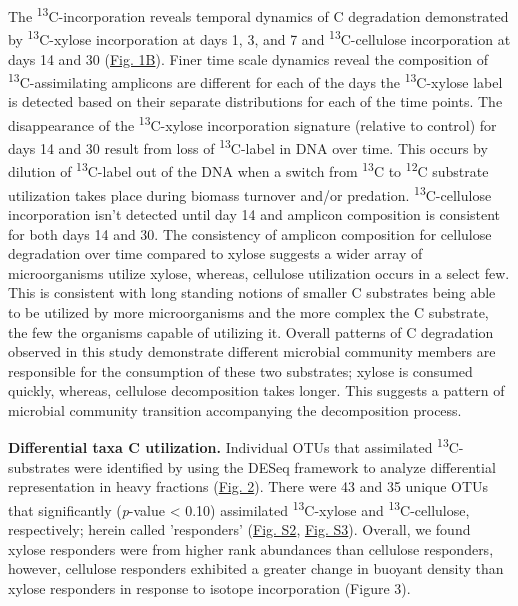 The \textsuperscript{13}C-incorporation reveals temporal dynamics of C degradation demonstrated by \textsuperscript{13}C-xylose incorporation at days 1, 3, and 7 and \textsuperscript{13}C-cellulose incorporation at days 14 and 30 (\href{https://www.authorea.com/users/3537/articles/3612/master/file/figures/ordination_all1/ordination_all1.png}{Fig. 1B}). Finer time scale dynamics reveal the composition of \textsuperscript{13}C-assimilating amplicons are different for each of the days the \textsuperscript{13}C-xylose label is detected based on their separate distributions for each of the time points. The disappearance of the \textsuperscript{13}C-xylose incorporation signature (relative to control) for days 14 and 30 result from loss of \textsuperscript{13}C-label in DNA over time. This occurs by dilution of \textsuperscript{13}C-label out of the DNA when a switch from \textsuperscript{13}C to \textsuperscript{12}C substrate utilization takes place during biomass turnover and/or predation. \textsuperscript{13}C-cellulose incorporation isn't detected until day 14 and amplicon composition is consistent for both days 14 and 30.  The consistency of amplicon composition for cellulose degradation over time compared to xylose suggests a wider array of microorganisms utilize xylose, whereas, cellulose utilization occurs in a select few.  This is consistent with long standing notions of smaller C substrates being able to be utilized by more microorganisms and the more complex the C substrate, the few the organisms capable of utilizing it. Overall patterns of C degradation observed in this study demonstrate different microbial community members are responsible for the consumption of these two substrates; xylose is consumed quickly, whereas, cellulose decomposition takes longer. This suggests a pattern of microbial community transition accompanying the decomposition process. 





\textbf{Differential taxa C utilization.} Individual OTUs that assimilated \textsuperscript{13}C-substrates were identified by using the DESeq framework \cite{Anders_Huber_2010} to analyze differential representation in heavy fractions (\href{https://www.authorea.com/users/3537/articles/3612/master/file/figures/l2fc_fig1/l2fc_fig.pdf}{Fig. 2}). There were 43 and 35 unique OTUs that significantly (\textit{p}-value < 0.10) assimilated \textsuperscript{13}C-xylose and \textsuperscript{13}C-cellulose, respectively; herein called 'responders' (\href{https://www.authorea.com/users/3537/articles/8459/master/file/figures/OTU_screening_schematic/OTU_screening_schematic.pdf}{Fig. S2}, \href{https://www.authorea.com/users/3537/articles/8459/master/file/figures/l2fc_fig_pVal/l2fc_fig_pVal.png}{Fig. S3}). Overall, we found xylose responders were from higher rank abundances than cellulose responders, however, cellulose responders exhibited a greater change in buoyant density than xylose responders in response to isotope incorporation (Figure 3). 


